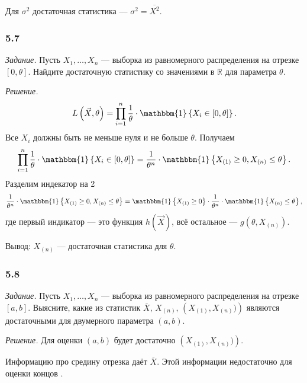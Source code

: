 Для $ \sigma^2$ достаточная статистика --- $ \hat{ \sigma^2} = \overline{X^2}$.

\subsubsection{5.7}

\textit{Задание.}
Пусть $X_1, \dotsc, X_n$ ---
выборка из равномерного распределения на отрезке $ \left[ 0, \theta \right] $.
Найдите достаточную статистику со значениями в $ \mathbb{R}$ для параметра $ \theta $.

\textit{Решение.}
$$L \left( \vec{X}, \theta \right) =
  \prod \limits_{i = 1}^n
    \frac{1}{ \theta } \cdot \mathbbm{1} \left\{ X_i \in \left[ 0, \theta \right] \right\}.$$
Все $X_i$ должны быть не меньше нуля и не больше $ \theta $.
Получаем
$$ \prod \limits_{i = 1}^n
    \frac{1}{ \theta } \cdot \mathbbm{1} \left\{ X_i \in \left[ 0, \theta \right] \right\} =
  \frac{1}{ \theta^n} \cdot
  \mathbbm{1} \left\{ X_{ \left( 1 \right) } \geq 0, X_{ \left( n \right) } \leq \theta \right\}.$$
Разделим индекатор на 2
$$ \frac{1}{ \theta^n} \cdot
  \mathbbm{1} \left\{ X_{ \left( 1 \right) } \geq 0, X_{ \left( n \right) } \leq \theta \right\} =
  \mathbbm{1} \left\{ X_{ \left( 1 \right) } \geq 0 \right\} \cdot
  \frac{1}{ \theta^n} \cdot \mathbbm{1} \left\{ X_{ \left( n \right) } \leq \theta \right\},$$
где первый индикатор --- это функция $h \left( \vec{X} \right) $, всё остальное ---
$g \left( \theta, X_{ \left( n \right) } \right) $.

Вывод: $X_{ \left( n \right) }$ --- достаточная статистика для $ \theta $.

\subsubsection{5.8}

\textit{Задание.}
Пусть $X_1, \dotsc, X_n$ ---
выборка из равномерного распределения на отрезке $ \left[ a, b \right] $.
Выясните,
какие из статистик
$ \overline{X}, \,
  X_{ \left( n \right) }, \,
  \left( X_{ \left( 1 \right) }, X_{ \left( n \right) }) \right) $
являются достаточными для двумерного параметра $ \left( a, b \right) $.

\textit{Решение.} Для оценки $ \left( a, b \right) $ будет достаточно
$ \left( X_{ \left( 1 \right) }, X_{ \left( n \right) }) \right) $.

Информацию про средину отрезка даёт $ \overline{X}$.
Этой информации недостаточно для оценки концов .

